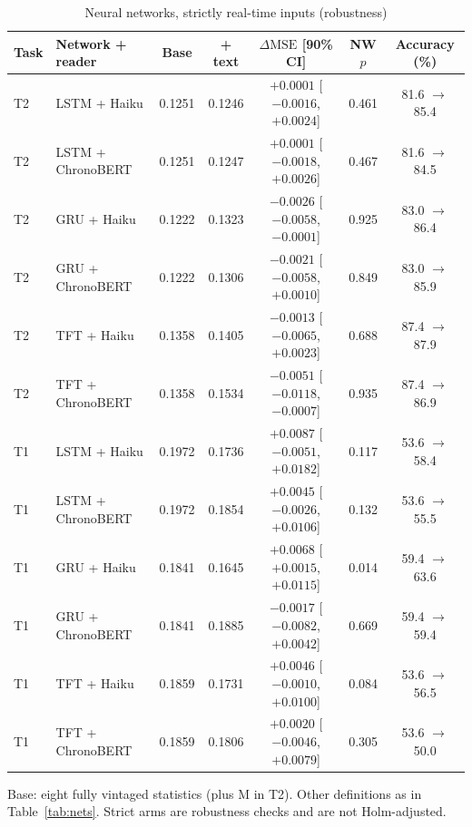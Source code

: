 \documentclass[11pt]{article}
\newcommand{\dmse}{\Delta\mathrm{MSE}}
\begin{document}
\begin{table}[ht]\centering\footnotesize\setlength{\tabcolsep}{3.5pt}
\begin{threeparttable}
\caption{Neural networks, strictly real-time inputs (robustness)}\label{tab:strict}
\begin{tabular}{llccccc}
\toprule
Task & Network + reader & Base & + text & $\dmse$ [90\% CI] & NW $p$ & Accuracy (\%) \\ \midrule
T2 & LSTM + Haiku      & 0.1251 & 0.1246 & $+0.0001$ [$-0.0016$, $+0.0024$] & 0.461 & 81.6 $\to$ 85.4 \\
T2 & LSTM + ChronoBERT & 0.1251 & 0.1247 & $+0.0001$ [$-0.0018$, $+0.0026$] & 0.467 & 81.6 $\to$ 84.5 \\
T2 & GRU + Haiku       & 0.1222 & 0.1323 & $-0.0026$ [$-0.0058$, $-0.0001$] & 0.925 & 83.0 $\to$ 86.4 \\
T2 & GRU + ChronoBERT  & 0.1222 & 0.1306 & $-0.0021$ [$-0.0058$, $+0.0010$] & 0.849 & 83.0 $\to$ 85.9 \\
T2 & TFT + Haiku       & 0.1358 & 0.1405 & $-0.0013$ [$-0.0065$, $+0.0023$] & 0.688 & 87.4 $\to$ 87.9 \\
T2 & TFT + ChronoBERT  & 0.1358 & 0.1534 & $-0.0051$ [$-0.0118$, $-0.0007$] & 0.935 & 87.4 $\to$ 86.9 \\ \midrule
T1 & LSTM + Haiku      & 0.1972 & 0.1736 & $+0.0087$ [$-0.0051$, $+0.0182$] & 0.117 & 53.6 $\to$ 58.4 \\
T1 & LSTM + ChronoBERT & 0.1972 & 0.1854 & $+0.0045$ [$-0.0026$, $+0.0106$] & 0.132 & 53.6 $\to$ 55.5 \\
T1 & GRU + Haiku       & 0.1841 & 0.1645 & $+0.0068$ [$+0.0015$, $+0.0115$] & 0.014 & 59.4 $\to$ 63.6 \\
T1 & GRU + ChronoBERT  & 0.1841 & 0.1885 & $-0.0017$ [$-0.0082$, $+0.0042$] & 0.669 & 59.4 $\to$ 59.4 \\
T1 & TFT + Haiku       & 0.1859 & 0.1731 & $+0.0046$ [$-0.0010$, $+0.0100$] & 0.084 & 53.6 $\to$ 56.5 \\
T1 & TFT + ChronoBERT  & 0.1859 & 0.1806 & $+0.0020$ [$-0.0046$, $+0.0079$] & 0.305 & 53.6 $\to$ 50.0 \\
\bottomrule
\end{tabular}
\begin{tablenotes}\footnotesize
\item Base: eight fully vintaged statistics (plus M in T2). Other definitions as in Table~\ref{tab:nets}. Strict
arms are robustness checks and are not Holm-adjusted.
\end{tablenotes}
\end{threeparttable}
\end{table}
\end{document}

